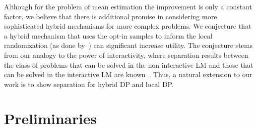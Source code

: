 \documentclass{article}
\theoremstyle{plain}
\begin{document}

Although for the problem of mean estimation the improvement is only a constant factor, we believe that there is additional promise in considering more sophisticated hybrid mechanisms for more complex problems. We conjecture that a hybrid mechanism that uses the opt-in samples to inform the local randomization (as done by~\cite{blender}) can significant increase utility. The conjecture stems from our analogy to the power of interactivity, where separation results between the class of problems that can be solved in the non-interactive LM and those that can be solved in the interactive LM are known~\cite{Kasiviswanathan:2011:WLP:2078965.2078976}. Thus, a natural extension to our work is to show separation for hybrid DP and local DP. %




\small



\appendix
\section{Preliminaries}\label{sec:preliminaries}

\end{document}

